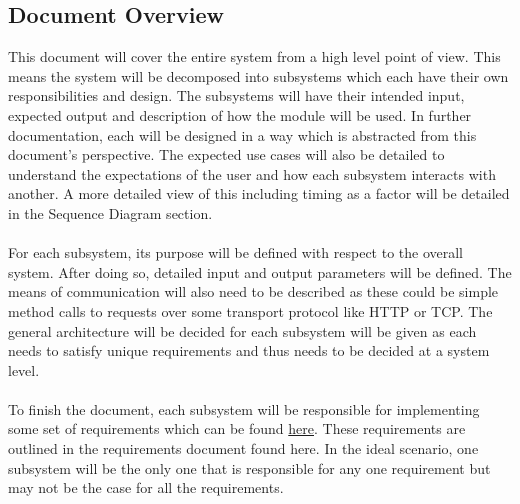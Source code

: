 \documentclass[11pt]{article}
\begin{document}
\subsection{Document Overview}
This document will cover the entire system from a high level point of view. This means the system will be decomposed into subsystems which each have their own responsibilities and design. The subsystems will have their intended input, expected output and description of how the module will be used. In further documentation, each will be designed in a way which is abstracted from this document's perspective. The expected use cases will also be detailed to understand the expectations of the user and how each subsystem interacts with another. A more detailed view of this including timing as a factor will be detailed in the Sequence Diagram section. \\ \\
For each subsystem, its purpose will be defined with respect to the overall system. After doing so, detailed input and output parameters will be defined. The means of communication will also need to be described as these could be simple method calls to requests over some transport protocol like HTTP or TCP. The general architecture will be decided for each subsystem will be given as each needs to satisfy unique requirements and thus needs to be decided at a system level. \\ \\
To finish the document, each subsystem will be responsible for implementing some set of requirements which can be found \href{run:../Requirements/Requirements.pdf}{here}. These requirements are outlined in the requirements document found here.
In the ideal scenario, one subsystem will be the only one that is responsible for any one requirement but may not be the case for all the requirements. 
\end{document}
